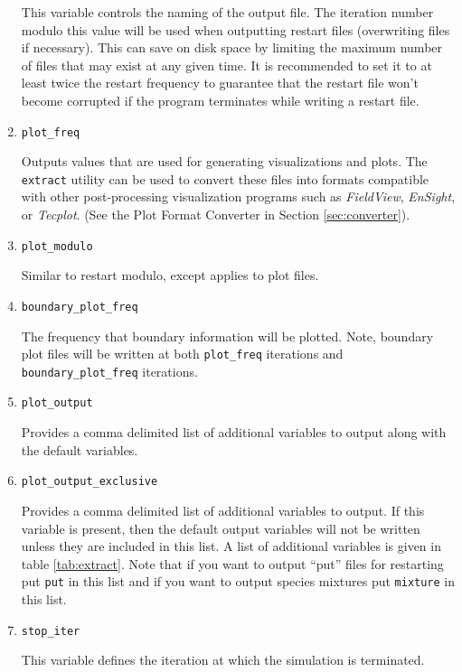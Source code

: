 \documentclass{article}
\begin{document}
\begin{enumerate}
This variable controls the naming of the output file.  The iteration
number modulo this value will be used when outputting restart files
(overwriting files if necessary).  This can save on disk space by
limiting the maximum number of files that may exist at any given time.
It is recommended to set it to at least twice the restart frequency to
guarantee that the restart file won't become corrupted if the program
terminates while writing a restart file.


\item {\tt plot\_freq}

Outputs values that are used for generating visualizations and plots.
The {\tt extract} utility can be used to convert these files into
formats compatible with other post-processing visualization programs
such as {\em FieldView}, {\em EnSight}, or {\em Tecplot}. (See the Plot Format Converter in Section
\ref{sec:converter}).

\item {\tt plot\_modulo}

Similar to restart modulo, except applies to plot files.

\item {\tt boundary\_plot\_freq}

  The frequency that boundary information will be plotted.  Note,
  boundary plot files will be written at both {\tt plot\_freq}
  iterations and {\tt boundary\_plot\_freq} iterations.

\item {\tt plot\_output}

  Provides a comma delimited list of additional variables to output
  along with the default variables.  

\item {\tt plot\_output\_exclusive}

  Provides a comma delimited list of additional variables to output.
  If this variable is present, then the default output variables
  will not be written unless they are included in this list.  A list
  of additional variables is given in table
  \ref{tab:extract}. %
  Note that if you
  want to output ``put'' files for restarting put {\tt put} in this
  list and if you want to output species mixtures put {\tt mixture} in
  this list.

\item {\tt stop\_iter}

  This variable defines the iteration at which the simulation is terminated.


\end{enumerate}
\end{document}
